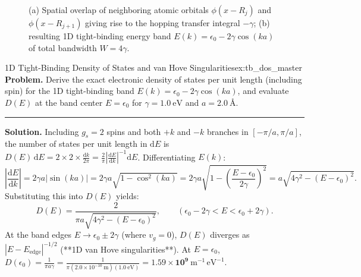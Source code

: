 \documentclass[11pt,a4paper]{article}
\newcommand{\abs}[1]{\left|#1\right|}
\newcommand{\dv}[2]{\frac{\mathrm{d}#1}{\mathrm{d}#2}}
\newcommand{\dd}{\mathrm{d}}
\begin{document}
\begin{figure}[htbp]
\caption{(a) Spatial overlap of neighboring atomic orbitals $\phi(x - R_j)$ and $\phi(x - R_{j+1})$ giving rise to the hopping transfer integral $-\gamma$; (b) resulting 1D tight-binding energy band $E(k) = \epsilon_0 - 2\gamma\cos(ka)$ of total bandwidth $W = 4\gamma$.}
\label{fig:tb_model_master}
\end{figure}

\begin{examplebox}{1D Tight-Binding Density of States and van Hove Singularities}{ex:tb_dos_master}
\textbf{Problem.} Derive the exact electronic density of states per unit length (including spin) for the 1D tight-binding band $E(k) = \epsilon_0 - 2\gamma\cos(ka)$, and evaluate $D(E)$ at the band center $E = \epsilon_0$ for $\gamma = 1.0\ \mathrm{eV}$ and $a = 2.0\ \text{\AA}$.
\vspace{0.2cm}\hrule\vspace{0.2cm}
\textbf{Solution.}
Including $g_s = 2$ spins and both $+k$ and $-k$ branches in $[-\pi/a, \pi/a]$, the number of states per unit length in $\dd E$ is $D(E)\,\dd E = 2 \times 2 \times \frac{\dd k}{2\pi} = \frac{2}{\pi}\abs{\dv{E}{k}}^{-1}\dd E$. Differentiating $E(k)$:
\[
    \abs{\dv{E}{k}} = 2\gamma a\abs{\sin(ka)} = 2\gamma a\sqrt{1 - \cos^2(ka)} = 2\gamma a\sqrt{1 - \left(\frac{E - \epsilon_0}{2\gamma}\right)^2} = a\sqrt{4\gamma^2 - (E - \epsilon_0)^2}.
\]
Substituting this into $D(E)$ yields:
\[
    \boxed{D(E) = \frac{2}{\pi a\sqrt{4\gamma^2 - (E - \epsilon_0)^2}}, \qquad (\epsilon_0 - 2\gamma < E < \epsilon_0 + 2\gamma).}
\]
At the band edges $E \to \epsilon_0 \pm 2\gamma$ (where $v_g = 0$), $D(E)$ diverges as $\abs{E - E_{\mathrm{edge}}}^{-1/2}$ (**1D van Hove singularities**). At $E = \epsilon_0$, $D(\epsilon_0) = \frac{1}{\pi a\gamma} = \frac{1}{\pi(2.0\times 10^{-10}\ \mathrm{m})(1.0\ \mathrm{eV})} = \mathbf{1.59 \times 10^{9}\ \mathrm{m^{-1}\,eV^{-1}}}$.
\end{examplebox}
\end{document}
